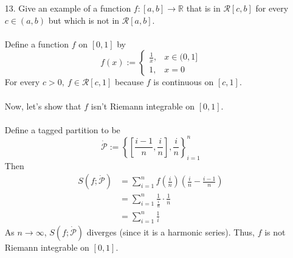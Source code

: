 \documentclass[12pt,letterpaper]{article}
\newcommand{\R}{\mathbb{R}}
\newcommand{\dotp}{\dot{\mathcal{P}}}
\theoremstyle{case}
\theoremstyle{definition}
\begin{document}
\begin{enumerate}
\begin{enumerate}
\begin{proof}
				\[h(x)\geq m > 0,\ \forall\ x \in [a,b]\]
				Then we have
				\[\int_{a}^{b} h \geq \int_{a}^{b} m=m(b-a)>0\]
				This is a contradiction with the fact that $\int_{a}^{b} h=0$.
				\\\\Now, for the case in which $h(x)<0,\ \forall\ x \in [a,b]$, by the \textit{Maximum-Minimum Theorem} we know that there exists $M<0$ such that
				\[h(x)\leq M < 0\ \forall\ x \in [a,b]\]
				and thus
				\[\int_{a}^{b} h \leq \int_{a}^{b} M \leq M(b-a)<0\]
				which again yields a contradiction.
				\\\\Therefore, there exists $c \in [a,b]$ such that $h(c)=0$, that is, $f(c)=g(c)$.
			\end{proof}
			\item[13.] Give an example of a function $f:[a,b] \to \R$ that is in $\mathcal{R}[c,b]$ for every $c \in (a,b)$ but which is not in $\mathcal{R}[a,b]$.
			\\\\Define a function $f$ on $[0,1]$ by
			\[f(x):=\begin{cases}
			\frac{1}{x}, &x \in (0,1] \\
			1, &x=0
			\end{cases}\]
			For every $c>0,\ f \in \mathcal{R}[c,1]$ because $f$ is continuous on $[c,1]$.
			\\\\Now, let's show that $f$ isn't Riemann integrable on $[0,1]$.
			\\\\Define a tagged partition to be
			\[\dotp := \left\{\left[\frac{i-1}{n},\frac{i}{n}\right],\frac{i}{n}\right\}_{i=1}^n\]
			Then
			\begin{align*}
				S(f;\dotp) &= \sum_{i=1}^{n} f \left(\frac{i}{n}\right)\left(\frac{i}{n}-\frac{i-1}{n}\right) \\
				&= \sum_{i=1}^{n}\frac{1}{\frac{i}{n}} \cdot \frac{1}{n} \\
				&= \sum_{i=1}^{n} \frac{1}{i}
			\end{align*}
			As $n \to \infty$, $S(f;\dotp)$ diverges (since it is a harmonic series). Thus, $f$ is not Riemann integrable on $[0,1]$.
		\end{enumerate}

\end{enumerate}
\end{document}
